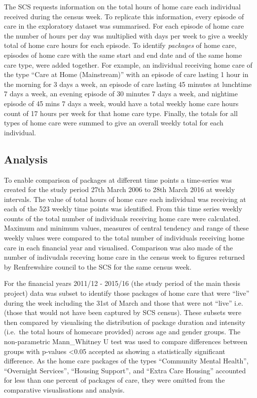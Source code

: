 \documentclass[]{article}
\begin{document}
The SCS requests information on the total hours of home care each
individual received during the census week. To replicate this
information, every episode of care in the exploratory dataset was
summarised. For each episode of home care the number of hours per day
was multiplied with days per week to give a weekly total of home care
hours for each episode. To identify \emph{packages} of home care,
episodes of home care with the same start and end date and of the same
home care type, were added together. For example, an individual
receiving home care of the type ``Care at Home (Mainstream)'' with an
episode of care lasting 1 hour in the morning for 3 days a week, an
episode of care lasting 45 minutes at lunchtime 7 days a week, an
evening episode of 30 minutes 7 days a week, and nightime episode of 45
mins 7 days a week, would have a total weekly home care hours count of
17 hours per week for that home care type. Finally, the totals for all
types of home care were summed to give an overall weekly total for each
individual.

\subsection{Analysis}\label{subsec:renf-methods-analysis}

To enable comparison of packages at different time points a time-series
was created for the study period 27th March 2006 to 28th March 2016 at
weekly intervals. The value of total hours of home care each individual
was receiving at each of the 523 weekly time points was identified. From
this time series weekly counts of the total number of individuals
receiving home care were calculated. Maximum and minimum values,
measures of central tendency and range of these weekly values were
compared to the total number of individuals receiving home care in each
financial year and visualised. Comparison was also made of the number of
indivudals receving home care in the census week to figures returned by
Renfrewshire council to the SCS for the same census week.

For the financial years 2011/12 - 2015/16 (the study period of the main
thesis project) data was subset to identify those packages of home care
that were ``live'' during the week including the 31st of March and those
that were not ``live'' i.e. (those that would not have been captured by
SCS census). These subsets were then compared by visualising the
distribution of package duration and intensity (i.e.~the total hours of
homecare provided) across age and gender groups. The non-parametric
Mann\_Whitney U test was used to compare differences between groups with
p-values \textless{}0.05 accepted as showing a statistically significant
difference. As the home care packages of the types ``Community Mental
Health'', ``Overnight Services'', ``Housing Support'', and ``Extra Care
Housing'' accounted for less than one percent of packages of care, they
were omitted from the comparative visualisations and analysis.
\end{document}
